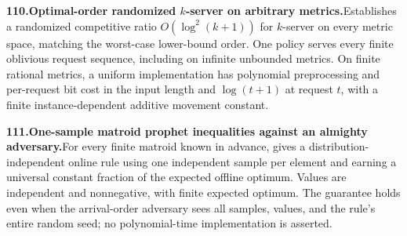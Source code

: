 \documentclass[11pt,a4paper]{article}
\begin{document}
  \par \begin{minipage}{\linewidth}
  \fontsize{10.5}{12.6}\selectfont\RaggedRight
  \hypertarget{result 110}{}
  {\bfseries\textcolor{muted}{110.}\enspace Optimal-order randomized $k$-server on arbitrary metrics.}\enspace Establishes a randomized competitive ratio $O(\log^2(k+1))$ for $k$-server on every metric space, matching the worst-case lower-bound order. One policy serves every finite oblivious request sequence, including on infinite unbounded metrics. On finite rational metrics, a uniform implementation has polynomial preprocessing and per-request bit cost in the input length and $\log(t+1)$ at request $t$, with a finite instance-dependent additive movement constant.\par
  \end{minipage}\par\vspace{5pt}



  \par \begin{minipage}{\linewidth}
  \fontsize{10.5}{12.6}\selectfont\RaggedRight
  \hypertarget{result 111}{}
  {\bfseries\textcolor{muted}{111.}\enspace One-sample matroid prophet inequalities against an almighty adversary.}\enspace For every finite matroid known in advance, gives a distribution-independent online rule using one independent sample per element and earning a universal constant fraction of the expected offline optimum. Values are independent and nonnegative, with finite expected optimum. The guarantee holds even when the arrival-order adversary sees all samples, values, and the rule's entire random seed; no polynomial-time implementation is asserted.\par
  \end{minipage}\par\vspace{5pt}
\end{document}
